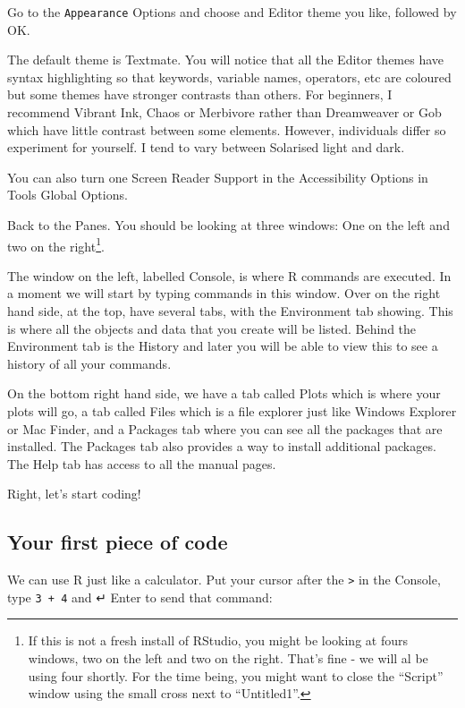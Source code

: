 \documentclass[
  letterpaper,
  DIV=11,
  numbers=noendperiod]{scrreprt}
\begin{document}
Go to the \texttt{Appearance} Options and choose and Editor theme you
like, followed by OK.

The default theme is Textmate. You will notice that all the Editor
themes have syntax highlighting so that keywords, variable names,
operators, etc are coloured but some themes have stronger contrasts than
others. For beginners, I recommend Vibrant Ink, Chaos or Merbivore
rather than Dreamweaver or Gob which have little contrast between some
elements. However, individuals differ so experiment for yourself. I tend
to vary between Solarised light and dark.

You can also turn one Screen Reader Support in the Accessibility Options
in Tools \textbar{} Global Options.

Back to the Panes. You should be looking at three windows: One on the
left and two on the right\footnote{If this is not a fresh install of
  RStudio, you might be looking at fours windows, two on the left and
  two on the right. That's fine - we will al be using four shortly. For
  the time being, you might want to close the ``Script'' window using
  the small cross next to ``Untitled1''.}.

The window on the left, labelled Console, is where R commands are
executed. In a moment we will start by typing commands in this window.
Over on the right hand side, at the top, have several tabs, with the
Environment tab showing. This is where all the objects and data that you
create will be listed. Behind the Environment tab is the History and
later you will be able to view this to see a history of all your
commands.

On the bottom right hand side, we have a tab called Plots which is where
your plots will go, a tab called Files which is a file explorer just
like Windows Explorer or Mac Finder, and a Packages tab where you can
see all the packages that are installed. The Packages tab also provides
a way to install additional packages. The Help tab has access to all the
manual pages.

Right, let's start coding!

\hypertarget{your-first-piece-of-code}{%
\subsection{Your first piece of code}\label{your-first-piece-of-code}}

We can use R just like a calculator. Put your cursor after the
\texttt{\textgreater{}} in the Console, type \texttt{3\ +\ 4} and ↵
Enter to send that command:
\end{document}
